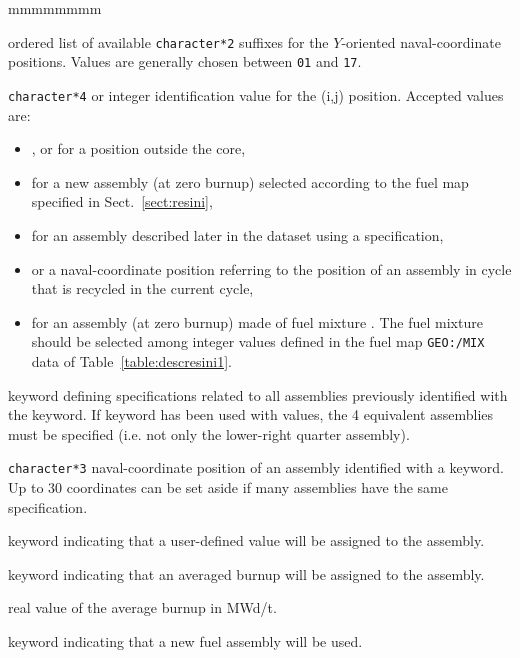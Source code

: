 \begin{ListeDeDescription}{mmmmmmmm}
\item[\dusa{hy}] ordered list of available \texttt{character*2} suffixes for the $Y$-oriented
naval-coordinate positions. Values are generally chosen between {\tt 01} and {\tt 17}.

\item[\dusa{hcase}] \texttt{character*4} or integer identification value for the (i,j) position. Accepted
values are:
\begin{itemize}
\item \moc{|}, \moc{-} or \moc{-|-} for a position outside the core,
\item {} for a new assembly (at zero burnup) selected according to the fuel map specified in Sect.~\ref{sect:resini},
\item {} for an assembly described later in the dataset using a  specification,
\item or a naval-coordinate position referring to the position of an assembly in cycle  that is
recycled in the current cycle,
\item {} for an assembly (at zero burnup) made of fuel mixture . The fuel mixture should be selected among integer values defined
in the fuel map {\tt GEO:/MIX} data of Table~\ref{table:descresini1}.
\end{itemize}

\item[\moc{SPEC}] keyword defining specifications related to all assemblies previously identified with
the  keyword. If  keyword has been used with  values, the 4 equivalent
assemblies must be specified (i.e. not only the lower-right quarter assembly).

\item[\dusa{asmb1}] \texttt{character*3} naval-coordinate position of an assembly identified with a  keyword. Up to 30 coordinates can be set aside
if many assemblies have the same specification.

\item[\moc{SET}] keyword indicating that a user-defined value will be assigned to the assembly.

\item[\moc{AVGB}] keyword indicating that an averaged burnup will be assigned to the assembly.

\item[\dusa{avburn}] real value of the average burnup in MWd/t.

\item[\moc{FUEL}] keyword indicating that a new fuel assembly will be used.


\end{ListeDeDescription}
